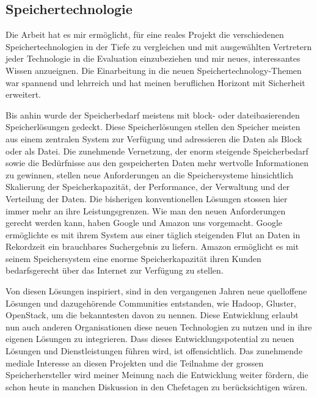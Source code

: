 \subsection{Speichertechnologie}
Die Arbeit hat es mir ermöglicht, für eine reales Projekt die verschiedenen Speichertechnologien in der Tiefe zu vergleichen und mit ausgewählten Vertretern jeder Technologie in die Evaluation einzubeziehen und mir neues, interessantes Wissen anzueignen. Die Einarbeitung in die neuen Speichertechnology-Themen war spannend und lehrreich und hat meinen beruflichen Horizont mit Sicherheit erweitert.

Bis anhin wurde der Speicherbedarf meistens mit block- oder dateibasierenden Speicherlösungen gedeckt. Diese Speicherlösungen stellen den Speicher meisten aus einem zentralen System zur Verfügung und adressieren die Daten als Block oder als Datei.
Die zunehmende Vernetzung, der enorm steigende Speicherbedarf sowie die Bedürfnisse aus den gespeicherten Daten mehr wertvolle Informationen zu gewinnen, stellen neue  Anforderungen an die Speichersysteme hinsichtlich Skalierung der Speicherkapazität, der Performance, der Verwaltung und der Verteilung der Daten. Die bisherigen konventionellen Lösungen stossen hier immer mehr an ihre Leistungsgrenzen. Wie man den neuen Anforderungen gerecht werden kann, haben Google und Amazon uns vorgemacht. Google ermöglichte es mit ihrem System aus einer täglich steigenden Flut an Daten in Rekordzeit ein brauchbares Suchergebnis zu liefern. Amazon ermöglicht es mit seinem Speichersystem eine enorme Speicherkapazität ihren Kunden bedarfsgerecht über das Internet zur Verfügung zu stellen. 

Von diesen Lösungen inspiriert, sind in den vergangenen Jahren neue quelloffene Lösungen und dazugehörende Communities entstanden, wie Hadoop, Gluster, OpenStack, um die bekanntesten davon zu nennen. Diese Entwicklung erlaubt nun auch anderen Organisationen diese neuen Technologien zu nutzen und in ihre eigenen Lösungen zu integrieren. Dass dieses Entwicklungspotential zu neuen Lösungen und Dienstleistungen führen wird, ist offensichtlich. Das zunehmende mediale Interesse an diesen Projekten und die Teilnahme der grossen Speicherhersteller wird meiner Meinung nach die Entwicklung weiter fördern, die schon heute in manchen Diskussion in den Chefetagen zu berücksichtigen wären. 

